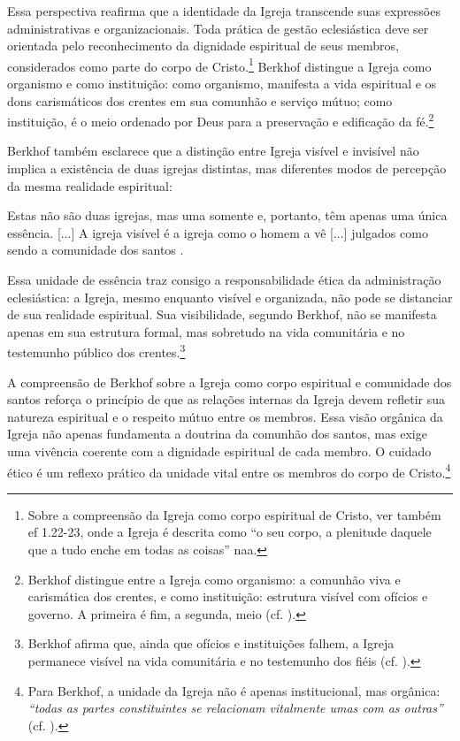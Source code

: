 Essa perspectiva reafirma que a identidade da Igreja transcende suas expressões administrativas e organizacionais. Toda prática de gestão eclesiástica deve ser orientada pelo reconhecimento da dignidade espiritual de seus membros, considerados como parte do corpo de Cristo.\footnote{Sobre a compreensão da Igreja como corpo espiritual de Cristo, ver também \gls{ef} 1.22-23, onde a Igreja é descrita como ``o seu corpo, a plenitude daquele que a tudo enche em todas as coisas'' \gls{naa}.} Berkhof distingue a Igreja como organismo e como instituição: como organismo, manifesta a vida espiritual e os dons carismáticos dos crentes em sua comunhão e serviço mútuo; como instituição, é o meio ordenado por Deus para a preservação e edificação da fé.\footnote{Berkhof distingue entre a Igreja como organismo: a comunhão viva e carismática dos crentes, e como instituição: estrutura visível com ofícios e governo. A primeira é fim, a segunda, meio (cf. \cite[p. 638]{berkhof2012}).}

Berkhof também esclarece que a distinção entre Igreja visível e invisível não implica a existência de duas igrejas distintas, mas diferentes modos de percepção da mesma realidade espiritual:

\begin{citacao}
Estas não são duas igrejas, mas uma somente e, portanto, têm apenas uma única essência. [...] A igreja visível é a igreja como o homem a vê [...] julgados como sendo a comunidade dos santos \cite[p. 642]{berkhof2012}.
\end{citacao}

Essa unidade de essência traz consigo a responsabilidade ética da administração eclesiástica: a Igreja, mesmo enquanto visível e organizada, não pode se distanciar de sua realidade espiritual. Sua visibilidade, segundo Berkhof, não se manifesta apenas em sua estrutura formal, mas sobretudo na vida comunitária e no testemunho público dos crentes.\footnote{Berkhof afirma que, ainda que ofícios e instituições falhem, a Igreja permanece visível na vida comunitária e no testemunho dos fiéis (cf. \cite[p. 645]{berkhof2012}).}

A compreensão de Berkhof sobre a Igreja como corpo espiritual e comunidade dos santos reforça o princípio de que as relações internas da Igreja devem refletir sua natureza espiritual e o respeito mútuo entre os membros. Essa visão orgânica da Igreja não apenas fundamenta a doutrina da comunhão dos santos, mas exige uma vivência coerente com a dignidade espiritual de cada membro. O cuidado ético é um reflexo prático da unidade vital entre os membros do corpo de Cristo.\footnote{Para Berkhof, a unidade da Igreja não é apenas institucional, mas orgânica: \textit{``todas as partes constituintes se relacionam vitalmente umas com as outras''} (cf. \cite[p. 646]{berkhof2012}).}

